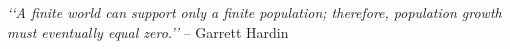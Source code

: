 \documentclass{sig-alternate-10pt}
\begin{document}
\maketitle



\emph{\lq \lq A finite world can support only a finite population; therefore, population growth must eventually equal zero.\rq \rq} -- Garrett Hardin
\end{document}
